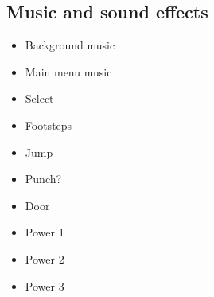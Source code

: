 \subsection{Music and sound effects}
\begin{itemize}  
\item Background music
\item Main menu music
\item Select 
\item Footsteps
\item Jump
\item Punch?
\item Door
\item Power 1
\item Power 2
\item Power 3
\end{itemize}
